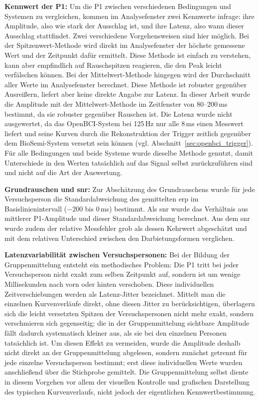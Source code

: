 \textbf{Kennwert der P1:} Um die P1 zwischen verschiedenen Bedingungen und Systemen zu vergleichen, kommen im Analysefenster zwei Kennwerte infrage: ihre Amplitude, also wie stark der Ausschlag ist, und ihre Latenz, also wann dieser Ausschlag stattfindet. Zwei verschiedene Vorgehensweisen sind hier möglich. Bei der Spitzenwert-Methode wird direkt im Analysefenster der höchste gemessene Wert und der Zeitpunkt dafür ermittelt. Diese Methode ist einfach zu verstehen, kann aber empfindlich auf Rauschspitzen reagieren, die den Peak leicht verfälschen können. Bei der Mittelwert-Methode hingegen wird der Durchschnitt aller Werte im Analysefenster berechnet. Diese Methode ist robuster gegenüber Ausreißern, liefert aber keine direkte Angabe zur Latenz. In dieser Arbeit wurde die Amplitude mit der Mittelwert-Methode im Zeitfenster von 80--200\,ms bestimmt, da sie robuster gegenüber Rauschen ist. Die Latenz wurde nicht ausgewertet, da das OpenBCI-System bei 125\,Hz nur alle 8\,ms einen Messwert liefert und seine Kurven durch die Rekonstruktion der Trigger zeitlich gegenüber dem BioSemi-System versetzt sein können (vgl. Abschnitt~\ref{sec:openbci_trigger}). Für alle Bedingungen und beide Systeme wurde dieselbe Methode genutzt, damit Unterschiede in den Werten tatsächlich auf das Signal selbst zurückzuführen sind und nicht auf die Art der Auswertung.

\textbf{Grundrauschen und \acrshort{snr}:} Zur Abschätzung des Grundrauschens wurde für jede Versuchsperson die Standardabweichung des gemittelten \acrshort{erp} im Basislinienintervall ($-$200 bis 0\,ms) bestimmt. Als \acrshort{snr} wurde das Verhältnis aus mittlerer P1-Amplitude und dieser Standardabweichung berechnet. Aus dem \acrshort{snr} wurde zudem der relative Messfehler grob als dessen Kehrwert abgeschätzt und mit dem relativen Unterschied zwischen den Darbietungsformen verglichen.

\textbf{Latenzvariabilität zwischen Versuchspersonen:} Bei der Bildung der Gruppenmittelung entsteht ein methodisches Problem: Die P1 tritt bei jeder Versuchsperson nicht exakt zum selben Zeitpunkt auf, sondern ist um wenige Millisekunden nach vorn oder hinten verschoben. Diese individuellen Zeitverschiebungen werden als Latenz-Jitter bezeichnet. Mittelt man die einzelnen Kurvenverläufe direkt, ohne diesen Jitter zu berücksichtigen, überlagern sich die leicht versetzten Spitzen der Versuchspersonen nicht mehr exakt, sondern \glqq verschmieren\grqq{} sich gegenseitig; die in der Gruppenmittelung sichtbare Amplitude fällt dadurch systematisch kleiner aus, als sie bei den einzelnen Personen tatsächlich ist. Um diesen Effekt zu vermeiden, wurde die Amplitude deshalb nicht direkt an der Gruppenmittelung abgelesen, sondern zunächst getrennt für jede einzelne Versuchsperson bestimmt; erst diese individuellen Werte wurden anschließend über die Stichprobe gemittelt. Die Gruppenmittelung selbst diente in diesem Vorgehen vor allem der visuellen Kontrolle und grafischen Darstellung des typischen Kurvenverlaufs, nicht jedoch der eigentlichen Kennwertbestimmung.

